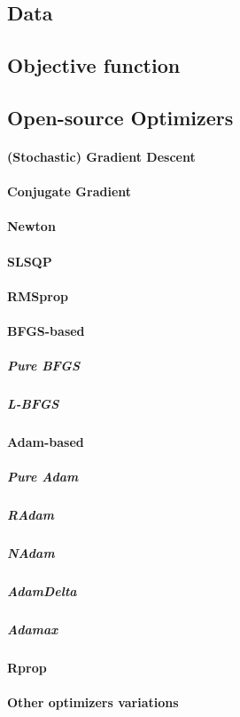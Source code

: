 \subsection{Data}
\subsection{Objective function}
\subsection{Open-source Optimizers}
\paragraph{(Stochastic) Gradient Descent}
\paragraph{Conjugate Gradient}
\paragraph{Newton}
\paragraph{SLSQP}
\paragraph{RMSprop}
\paragraph{BFGS-based}
\subparagraph{Pure BFGS}
\subparagraph{L-BFGS}
\paragraph{Adam-based}
\subparagraph{Pure Adam}
\subparagraph{RAdam}
\subparagraph{NAdam}
\subparagraph{AdamDelta}
\subparagraph{Adamax}
\paragraph{Rprop}
\paragraph{Other optimizers variations}

